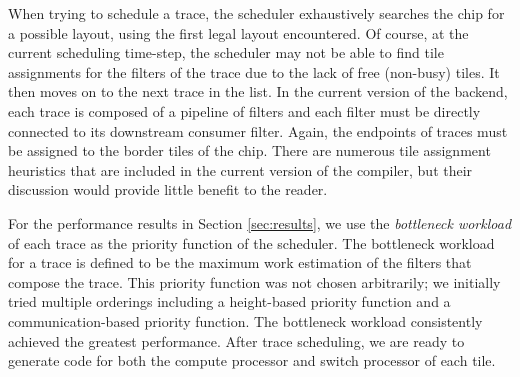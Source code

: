 When trying to schedule a trace, the scheduler exhaustively searches
the chip for a possible layout, using the first legal layout
encountered. Of course, at the current scheduling time-step, the
scheduler may not be able to find tile assignments for the filters of
the trace due to the lack of free (non-busy) tiles.  It then moves on
to the next trace in the list. In the current version of the backend,
each trace is composed of a pipeline of filters and each filter must
be directly connected to its downstream consumer filter.  Again, the
endpoints of traces must be assigned to the border tiles of the chip.
There are numerous tile assignment heuristics that are included in the
current version of the compiler, but their discussion would provide
little benefit to the reader.

For the performance results in Section \ref{sec:results}, we use the
{\it bottleneck workload} of each trace as the priority function of
the scheduler. The bottleneck workload for a trace is defined to be
the maximum work estimation of the filters that compose the trace.
This priority function was not chosen arbitrarily; we initially tried
multiple orderings including a height-based priority function and a
communication-based priority function.
The bottleneck workload consistently achieved the greatest
performance. After trace scheduling, we are ready to generate code for
both the compute processor and switch processor of each tile.
